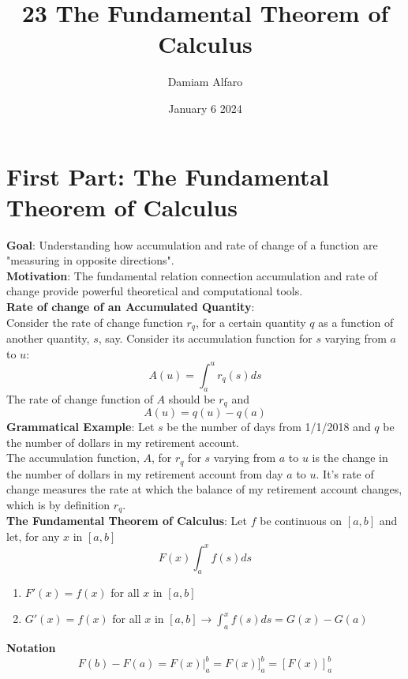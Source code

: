 \documentclass[12pt, letterpaper]{article}
\title{23 The Fundamental Theorem of Calculus}
\author{Damiam Alfaro}
\date{January 6 2024}
\begin{document}
\maketitle

\section{First Part: The Fundamental Theorem of Calculus}
\textbf{Goal}: Understanding how accumulation and rate of change of a function are "measuring in opposite directions".\\
\newline
\textbf{Motivation}: The fundamental relation connection accumulation and rate of change provide powerful theoretical and computational tools.\\
\newline
\textbf{Rate of change of an Accumulated Quantity}:\\
\newline
Consider the rate of change function \(r_q\), for a certain quantity \(q\) as a function of another quantity, \(s\), say. Consider its accumulation function for \(s\) varying from \(a\) to \(u\):
\[A(u) = \int_{a}^{u} r_q(s)ds\]
The rate of change function of \(A\) should be \(r_q\) and
\[A(u) = q(u)-q(a)\]
\textbf{Grammatical Example}: Let \(s\) be the number of days from 1/1/2018 and \(q\) be the number of dollars in my retirement account.\\
The accumulation function, \(A\), for \(r_q\) for \(s\) varying from \(a\) to \(u\) is the change in the number of dollars in my retirement account from day \(a\) to \(u\). It's rate of change measures the rate at which the balance of my retirement account changes, which is by definition \(r_q\).\\
\newline
\textbf{The Fundamental Theorem of Calculus}: Let \(f\) be continuous on \([a,b]\) and let, for any \(x\) in \([a,b]\)
\[F(x) \int_{a}^{x} f(s)ds\]
\begin{center}
\begin{enumerate}
    \item \(F'(x) = f(x)\) for all \(x\) in \([a,b]\)\\
    \item \(G'(x) = f(x)\) for all \(x\) in \([a,b] \to \int_{a}^{x} f(s)ds = G(x) - G(a)\)
\end{enumerate}
\end{center}
\textbf{Notation}
\[F(b)-F(a) = F(x)|_{a}^{b} = F(x)]_{a}^{b} = [F(x)]_{a}^{b}\]
\end{document}

